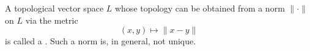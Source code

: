 A topological vector space $L$ whose topology can be obtained from a norm $\|\cdot\|$ on $L$ via the metric
$$(x, y) \mapsto \|x - y\|$$
is called a . Such a norm is, in general, not unique.
